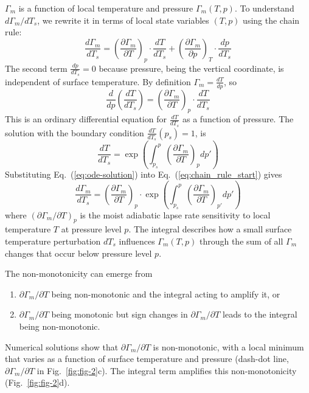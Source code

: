 \documentclass[]{ametsocV6.1}
\begin{document}
$\Gamma_m$ is a function of local temperature and pressure $\Gamma_m(T, p)$. To understand $d\Gamma_m/dT_s$, we rewrite it in terms of local state variables $(T, p)$ using the chain rule: 
\begin{equation}
\frac{d\Gamma_m}{dT_s} = \left(\frac{\partial\Gamma_m}{\partial T}\right)_p \cdot \frac{dT}{dT_s} + \left(\frac{\partial\Gamma_m}{\partial p}\right)_T \cdot \frac{dp}{dT_s} \label{eq:chain_rule_start}
\end{equation}
The second term $\frac{dp}{dT_s}=0$ because pressure, being the vertical coordinate, is independent of surface temperature. By definition $\Gamma_m = \frac{dT}{dp}$, so
\begin{equation}
    \frac{d}{dp}\left(\frac{dT}{dT_s}\right) = \left(\frac{\partial\Gamma_m}{\partial T}\right)_p \cdot \frac{dT}{dT_s} 
    \label{eq:ode}
\end{equation}
This is an ordinary differential equation for $\frac{dT}{dT_s}$ as a function of pressure. The solution with the boundary condition $\frac{dT}{dT_s}(p_s) = 1$, is
\begin{equation}
    \frac{dT}{dT_s} = \exp\left(\int_{p_s}^{p} \left(\frac{\partial\Gamma_m}{\partial T}\right)_p dp'\right)
    \label{eq:ode-solution}
\end{equation}
Substituting Eq.~(\ref{eq:ode-solution}) into Eq.~(\ref{eq:chain_rule_start}) gives
\begin{equation}
\frac{d\Gamma_m}{dT_s} = \left(\frac{\partial\Gamma_m}{\partial T}\right)_p \cdot \exp\left(\int_{p_s}^{p} \left(\frac{\partial\Gamma_m}{\partial T}\right)_{p'} dp'\right) \label{eq:total_sensitivity}
\end{equation}
where $(\partial\Gamma_m/\partial T)_p$ is the moist adiabatic lapse rate sensitivity to local temperature $T$ at pressure level $p$. The integral describes how a small surface temperature perturbation $dT_s$ influences $\Gamma_m(T, p)$ through the sum of all $\Gamma_m$ changes that occur below pressure level $p$.

The non-monotonicity can emerge from 
\begin{enumerate}
\item $\partial\Gamma_m/\partial T$ being non-monotonic and the integral acting to amplify it, or 
\item $\partial\Gamma_m/\partial T$ being monotonic but sign changes in $\partial\Gamma_m/\partial T$ leads to the integral being non-monotonic. 
\end{enumerate}
Numerical solutions show that $\partial\Gamma_m/\partial T$ is non-monotonic, with a local minimum that varies as a function of surface temperature and pressure (dash-dot line, $\partial\Gamma_m/\partial T$ in Fig.~\ref{fig:fig-2}c). The integral term amplifies this non-monotonicity (Fig.~\ref{fig:fig-2}d).
\end{document}
